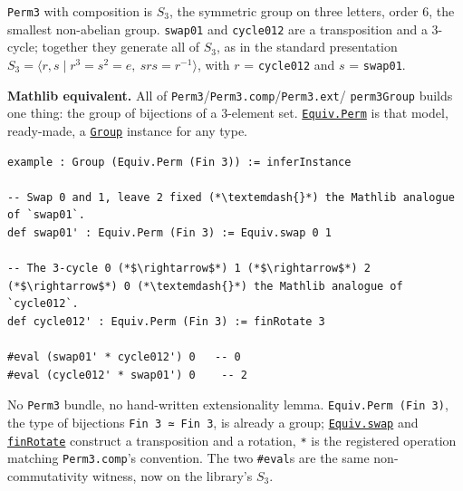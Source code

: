 \begin{mathreading}

\texttt{Perm3} with composition is \(S_3\), the symmetric group on three letters, order \(6\), the smallest non-abelian group. \texttt{swap01} and \texttt{cycle012} are a transposition and a 3-cycle; together they generate all of \(S_3\), as in the standard presentation \(S_3 = \langle r, s \mid r^3 = s^2 = e,\ srs = r^{-1} \rangle\), with \(r\) = \texttt{cycle012} and \(s\) = \texttt{swap01}.

\end{mathreading}

\textbf{Mathlib equivalent.} All of \texttt{Perm3}/\texttt{Perm3.comp}/\texttt{Perm3.ext}/ \texttt{perm3Group} builds one thing: the group of bijections of a 3-element set. \href{https://loogle.lean-lang.org/?q=Equiv.Perm}{\texttt{Equiv.Perm}} is that model, ready-made, a \href{https://loogle.lean-lang.org/?q=Group}{\texttt{Group}} instance for any type.

\begin{lstlisting}
example : Group (Equiv.Perm (Fin 3)) := inferInstance

-- Swap 0 and 1, leave 2 fixed (*\textemdash{}*) the Mathlib analogue of `swap01`.
def swap01' : Equiv.Perm (Fin 3) := Equiv.swap 0 1

-- The 3-cycle 0 (*$\rightarrow$*) 1 (*$\rightarrow$*) 2 (*$\rightarrow$*) 0 (*\textemdash{}*) the Mathlib analogue of `cycle012`.
def cycle012' : Equiv.Perm (Fin 3) := finRotate 3

#eval (swap01' * cycle012') 0   -- 0
#eval (cycle012' * swap01') 0    -- 2
\end{lstlisting}

No \texttt{Perm3} bundle, no hand-written extensionality lemma. \texttt{Equiv.Perm (Fin 3)}, the type of bijections \texttt{Fin 3 ≃ Fin 3}, is already a group; \href{https://loogle.lean-lang.org/?q=Equiv.swap}{\texttt{Equiv.swap}} and \href{https://loogle.lean-lang.org/?q=finRotate}{\texttt{finRotate}} construct a transposition and a rotation, \texttt{*} is the registered operation matching \texttt{Perm3.comp}'s convention. The two \texttt{\#eval}s are the same non-commutativity witness, now on the library's \(S_3\).

